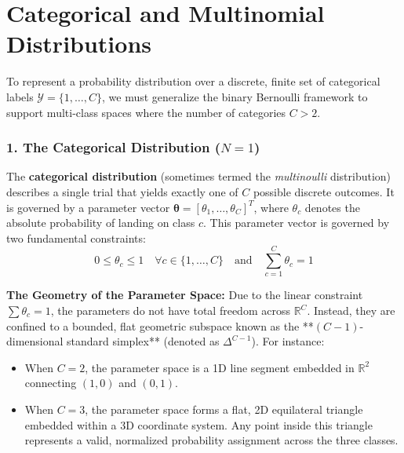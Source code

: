 \documentclass{article}
\begin{document}
\section*{Categorical and Multinomial Distributions}

To represent a probability distribution over a discrete, finite set of categorical labels $\mathcal{Y} = \{1, \dots, C\}$, we must generalize the binary Bernoulli framework to support multi-class spaces where the number of categories $C > 2$.

\subsubsection*{1. The Categorical Distribution ($N=1$)}
The \textbf{categorical distribution} (sometimes termed the \textit{multinoulli} distribution) describes a single trial that yields exactly one of $C$ possible discrete outcomes. It is governed by a parameter vector $\bm{\theta} = [\theta_1, \dots, \theta_C]^T$, where $\theta_c$ denotes the absolute probability of landing on class $c$. This parameter vector is governed by two fundamental constraints:
\begin{equation}
    0 \le \theta_c \le 1 \quad \forall c \in \{1,\dots,C\} \quad \text{and} \quad \sum_{c=1}^{C} \theta_c = 1
\end{equation}

\noindent \textbf{The Geometry of the Parameter Space:} Due to the linear constraint $\sum \theta_c = 1$, the parameters do not have total freedom across $\mathbb{R}^C$. Instead, they are confined to a bounded, flat geometric subspace known as the **$(C-1)$-dimensional standard simplex** (denoted as $\Delta^{C-1}$). For instance:
\begin{itemize}
    \item When $C=2$, the parameter space is a 1D line segment embedded in $\mathbb{R}^2$ connecting $(1,0)$ and $(0,1)$.
    \item When $C=3$, the parameter space forms a flat, 2D equilateral triangle embedded within a 3D coordinate system. Any point inside this triangle represents a valid, normalized probability assignment across the three classes.
\end{itemize}
\end{document}
